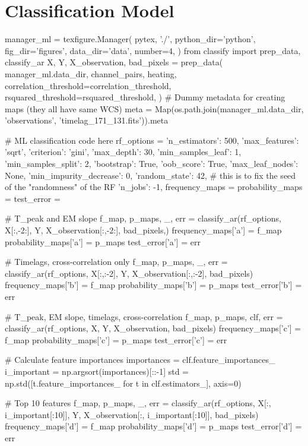\section{Classification Model}\label{sec:compare}

\begin{pycode}[manager_ml]
manager_ml = texfigure.Manager(
    pytex, './',
    python_dir='python',
    fig_dir='figures',
    data_dir='data',
    number=4,
)
from classify import prep_data, classify_ar
X, Y, X_observation, bad_pixels = prep_data(
    manager_ml.data_dir,
    channel_pairs,
    heating,
    correlation_threshold=correlation_threshold,
    rsquared_threshold=rsquared_threshold,
)
# Dummy metadata for creating maps (they all have same WCS)
meta = Map(os.path.join(manager_ml.data_dir, 'observations', 'timelag_171_131.fits')).meta

# ML classification code here
rf_options = {
    'n_estimators': 500,
    'max_features': 'sqrt',
    'criterion': 'gini',
    'max_depth': 30,
    'min_samples_leaf': 1,
    'min_samples_split': 2,
    'bootstrap': True,
    'oob_score': True,
    'max_leaf_nodes': None,
    'min_impurity_decrease': 0,
    'random_state': 42,  # this is to fix the seed of the "randomness" of the RF
    'n_jobs': -1,
}
frequency_maps = {}
probability_maps = {}
test_error = {}

# T_peak and EM slope
f_map, p_maps, _, err = classify_ar(rf_options, X[:,-2:], Y, X_observation[:,-2:], bad_pixels,)
frequency_maps['a'] = f_map
probability_maps['a'] = p_maps
test_error['a'] = err

# Timelags, cross-correlation only
f_map, p_maps, _, err = classify_ar(rf_options, X[:,:-2], Y, X_observation[:,:-2], bad_pixels)
frequency_maps['b'] = f_map
probability_maps['b'] = p_maps
test_error['b'] = err

# T_peak, EM slope, timelags, cross-correlation
f_map, p_maps, clf, err = classify_ar(rf_options, X, Y, X_observation, bad_pixels)
frequency_maps['c'] = f_map
probability_maps['c'] = p_maps
test_error['c'] = err

# Calculate feature importances
importances = clf.feature_importances_
i_important = np.argsort(importances)[::-1]
std = np.std([t.feature_importances_ for t in clf.estimators_], axis=0)

# Top 10 features
f_map, p_maps, _, err = classify_ar(rf_options, X[:, i_important[:10]], Y,
                                    X_observation[:, i_important[:10]], bad_pixels)
frequency_maps['d'] = f_map
probability_maps['d'] = p_maps
test_error['d'] = err
\end{pycode}

